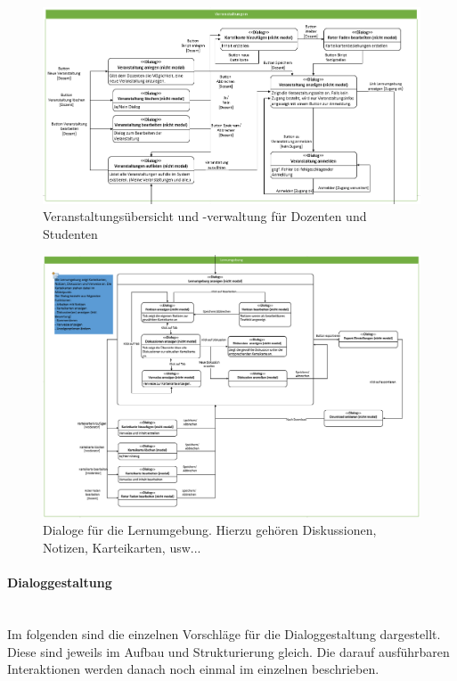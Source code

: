 \documentclass[12pt,a4paper]{article}
\begin{document}
{\begin{landscape}
\begin{figure}[H]
	\centering
	\includegraphics[width=25cm]{Bilder/Mockups/DSDVeranstaltungen.png}
	\caption{Veranstaltungsübersicht und -verwaltung für Dozenten und Studenten}
	\label{DSDVeranstaltung}
\end{figure}

\begin{figure}[H]
	\centering
	\includegraphics[width=24cm]{Bilder/Mockups/DSDLernumgebung.png}
	\caption{Dialoge für die Lernumgebung. Hierzu gehören Diskussionen, Notizen, Karteikarten, usw...}
	\label{DSDLernumgebung}
\end{figure}

\end{landscape}

\paragraph{Dialoggestaltung} \mbox{}\\
Im folgenden sind die einzelnen Vorschläge für die Dialoggestaltung dargestellt. Diese sind jeweils im Aufbau und Strukturierung gleich. Die darauf ausführbaren Interaktionen werden danach noch einmal im einzelnen beschrieben.\\

}
\end{document}
